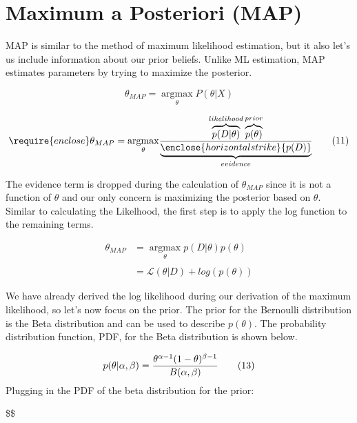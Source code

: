 \documentclass[]{book}
\theoremstyle{definition}
\theoremstyle{definition}
\theoremstyle{definition}
\theoremstyle{remark}
\begin{document}
\section{Maximum a Posteriori (MAP)}\label{maximum-a-posteriori-map}

MAP is similar to the method of maximum likelihood estimation, but it
also let's us include information about our prior beliefs. Unlike ML
estimation, MAP estimates parameters by trying to maximize the
posterior.

\[
\theta_{MAP}=\underset{\theta}{\operatorname{argmax}} P(\theta|X)
\tag{10}
\]

\[
\require{enclose}
\theta_{MAP}=\underset{\theta}{\operatorname{argmax}}{\overbrace{p(D|\theta)}^{likelihood}
  \overbrace{p(\theta)}^{prior} \over \underbrace{\enclose{horizontalstrike}{p(D)}}_{evidence}}
\tag{11}
\]

The evidence term is dropped during the calculation of \(\theta_{MAP}\)
since it is not a function of \(\theta\) and our only concern is
maximizing the posterior based on \(\theta\). Similar to calculating the
Likelhood, the first step is to apply the log function to the remaining
terms.

\[
\begin{aligned}
\theta_{MAP} &=\underset{\theta}{\operatorname{argmax}}p(D|\theta)p(\theta) \\\\
&= \mathcal{L}(\theta|D) + log(p(\theta))
\end{aligned}
\tag{12}
\]

We have already derived the log likelihood during our derivation of the
maximum likelihood, so let's now focus on the prior. The prior for the
Bernoulli distribution is the Beta distribution and can be used to
describe \(p(\theta)\). The probability distribution function, PDF, for
the Beta distribution is shown below.

\[
p(\theta|\alpha,\beta) = {\theta^{\alpha-1}(1-\theta)^{\beta-1}\over{B(\alpha, \beta)}}
\tag{13}
\] Plugging in the PDF of the beta distribution for the prior:

\$\$
\end{document}
